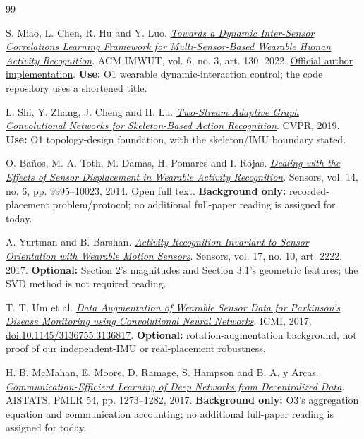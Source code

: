 \documentclass[10pt]{article}
\begin{document}
\begin{thebibliography}{99}
\ifdefined\roadmapobjectivesembedded
\setcounter{enumiv}{7}
\fi
\setlength{\itemsep}{6pt}
\setlength{\parskip}{0pt}
\raggedright

 S. Miao, L. Chen, R. Hu and Y. Luo.
\href{https://doi.org/10.1145/3550331}{\emph{Towards a Dynamic Inter-Sensor Correlations Learning Framework for Multi-Sensor-Based Wearable Human Activity Recognition}}.
ACM IMWUT, vol. 6, no. 3, art. 130, 2022.
\href{https://github.com/wdkhuans/DynamicWHAR}{Official author implementation}. \textbf{Use:} O1 wearable dynamic-interaction control; the code repository uses a shortened title.

 L. Shi, Y. Zhang, J. Cheng and H. Lu.
\href{https://arxiv.org/abs/1805.07694}{\emph{Two-Stream Adaptive Graph Convolutional Networks for Skeleton-Based Action Recognition}}.
CVPR, 2019. \textbf{Use:} O1 topology-design foundation, with the skeleton/IMU boundary stated.

 O. Ba\~nos, M. A. Toth, M. Damas, H. Pomares and I. Rojas.
\href{https://doi.org/10.3390/s140609995}{\emph{Dealing with the Effects of Sensor Displacement in Wearable Activity Recognition}}.
Sensors, vol. 14, no. 6, pp. 9995--10023, 2014.
\href{https://pmc.ncbi.nlm.nih.gov/articles/PMC4118358/}{Open full text}. \textbf{Background only:} recorded-placement problem/protocol; no additional full-paper reading is assigned for today.

 A. Yurtman and B. Barshan.
\href{https://doi.org/10.3390/s17102222}{\emph{Activity Recognition Invariant to Sensor Orientation with Wearable Motion Sensors}}.
Sensors, vol. 17, no. 10, art. 2222, 2017.
\textbf{Optional:} Section 2's magnitudes and Section 3.1's geometric features; the SVD method is not required reading.

 T. T. Um et al.
\href{https://arxiv.org/abs/1706.00527}{\emph{Data Augmentation of Wearable Sensor Data for Parkinson's Disease Monitoring using Convolutional Neural Networks}}.
ICMI, 2017, \href{https://doi.org/10.1145/3136755.3136817}{doi:10.1145/3136755.3136817}.
\textbf{Optional:} rotation-augmentation background, not proof of our independent-IMU or real-placement robustness.

 H. B. McMahan, E. Moore, D. Ramage, S. Hampson and B. A. y Arcas.
\href{https://proceedings.mlr.press/v54/mcmahan17a.html}{\emph{Communication-Efficient Learning of Deep Networks from Decentralized Data}}.
AISTATS, PMLR 54, pp. 1273--1282, 2017.
\textbf{Background only:} O3's aggregation equation and communication accounting; no additional full-paper reading is assigned for today.


\end{thebibliography}
\end{document}
